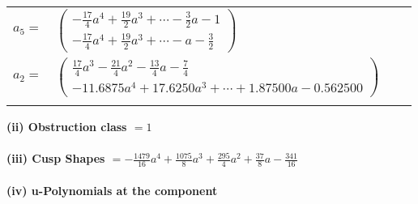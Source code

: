 \documentclass[1p]{elsarticle_modified}
\theoremstyle{definition}
\begin{document}
\begin{tabular}{m{7pt} m{180pt} m{7pt} m{180pt} }
\flushright $a_{5}=$&$\begin{pmatrix}-\frac{17}{4} a^4+\frac{19}{2} a^3+\cdots-\frac{3}{2} a-1\\-\frac{17}{4} a^4+\frac{19}{2} a^3+\cdots- a-\frac{3}{2}\end{pmatrix}$ \\
\flushright $a_{2}=$&$\begin{pmatrix}\frac{17}{4} a^3-\frac{21}{4} a^2-\frac{13}{4} a-\frac{7}{4}\\-11.6875 a^{4}+17.6250 a^{3}+\cdots+1.87500 a-0.562500\end{pmatrix}$\\&\end{tabular}
\flushleft \textbf{(ii) Obstruction class $= 1$}\\~\\
\flushleft \textbf{(iii) Cusp Shapes $= -\frac{1479}{16} a^4+\frac{1075}{8} a^3+\frac{295}{4} a^2+\frac{37}{8} a-\frac{341}{16}$}\\~\\
\newpage\renewcommand{\arraystretch}{1}
\flushleft \textbf{(iv) u-Polynomials at the component}\newline \\
\end{document}
